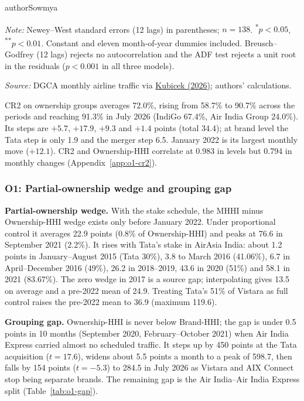 \begin{mergedcontribution}{authorSowmya}
\begin{minipage}{\linewidth}
{\footnotesize{}\raggedright\textit{Note:} Newey--West standard errors (12 lags) in parentheses; $n=138$. \textsuperscript{*}$p<0.05$, \textsuperscript{**}$p<0.01$. Constant and eleven month-of-year dummies included. Breusch--Godfrey (12 lags) rejects no autocorrelation and the ADF test rejects a unit root in the residuals ($p<0.001$ in all three models).\par
\textit{Source:} DGCA monthly airline traffic via \href{https://github.com/mkubicek/india-aviation-stats/tree/16770ac59dae61ce7b80fd8bd67dd7f4cef280a6}{Kubicek (2026)}; authors' calculations.\par}
\end{minipage}

CR2 on ownership groups averages 72.0\%, rising from 58.7\% to 90.7\% across the periods and reaching 91.3\% in July 2026 (IndiGo 67.4\%, Air India Group 24.0\%). Its steps are $+5.7$, $+17.9$, $+9.3$ and $+1.4$ points (total 34.4); at brand level the Tata step is only 1.9 and the merger step 6.5. January 2022 is its largest monthly move ($+12.1$). CR2 and Ownership-HHI correlate at 0.983 in levels but 0.794 in monthly changes (Appendix~\ref{app:o1-cr2}).

\subsubsection{O1: Partial-ownership wedge and grouping gap}
\label{app:o1-wedge}
\textbf{Partial-ownership wedge.} With the stake schedule, the MHHI minus Ownership-HHI wedge exists only before January 2022. Under proportional control it averages 22.9 points (0.8\% of Ownership-HHI) and peaks at 76.6 in September 2021 (2.2\%). It rises with Tata's stake in AirAsia India: about 1.2 points in January--August 2015 (Tata 30\%), 3.8 to March 2016 (41.06\%), 6.7 in April--December 2016 (49\%), 26.2 in 2018--2019, 43.6 in 2020 (51\%) and 58.1 in 2021 (83.67\%). The zero wedge in 2017 is a source gap; interpolating gives 13.5 on average and a pre-2022 mean of 24.9. Treating Tata's 51\% of Vistara as full control raises the pre-2022 mean to 36.9 (maximum 119.6).

\textbf{Grouping gap.} Ownership-HHI is never below Brand-HHI; the gap is under 0.5 points in 10 months (September 2020, February--October 2021) when Air India Express carried almost no scheduled traffic. It steps up by 450 points at the Tata acquisition ($t=17.6$), widens about 5.5 points a month to a peak of 598.7, then falls by 154 points ($t=-5.3$) to 284.5 in July 2026 as Vistara and AIX Connect stop being separate brands. The remaining gap is the Air India--Air India Express split (Table~\ref{tab:o1-gap}).


\end{mergedcontribution}
